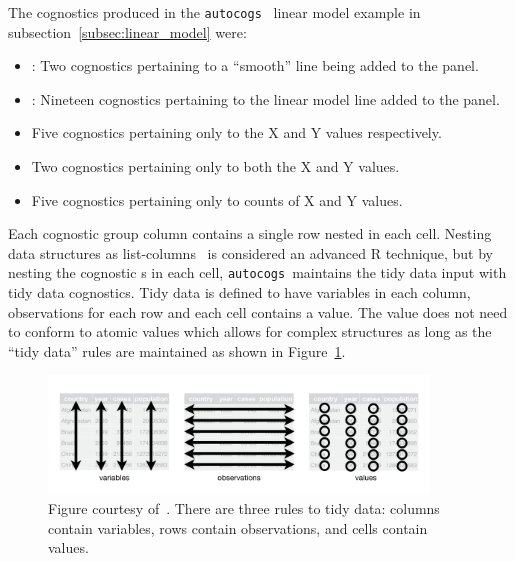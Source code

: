 \documentclass[stat,dissertation]{puthesis}\usepackage[]{graphicx}\usepackage{xcolor}
\newcommand{\pkg}[1]{\texttt{#1}}
\newcommand{\autocogs}{\pkg{autocogs}}
\begin{document}
The cognostics produced in the \autocogs~ linear model example in subsection~\ref{subsec:linear_model} were:
\begin{itemize}
  \item {}: Two cognostics pertaining to a ``smooth'' line being added to the panel.
  \item {}: Nineteen cognostics pertaining to the linear model line added to the panel.
  \item {} Five cognostics pertaining only to the X and Y values respectively.
  \item {} Two cognostics pertaining only to both the X and Y values.
  \item {} Five cognostics pertaining only to counts of X and Y values.
\end{itemize}

Each cognostic group column contains a single row  nested in each cell.  Nesting data structures as list-columns~\cite{r4ds} is considered an advanced R technique, but by nesting the cognostic s in each cell, \autocogs~maintains the tidy data input with tidy data cognostics.  Tidy data is defined to have variables in each column, observations for each row and each cell contains a value.  The value does not need to conform to atomic values which allows for complex structures as long as the ``tidy data'' rules are maintained as shown in Figure~\ref{fig:tidy_data}.


\begin{figure}[H]
  \label{fig:tidy_data}
  \centering
  \includegraphics[width=0.9\textwidth]{figs/tidy.png}
  \caption{Figure courtesy of~\cite{r4ds}. There are three rules to tidy data: columns contain variables, rows contain observations, and cells contain values.}
\end{figure}
\end{document}
